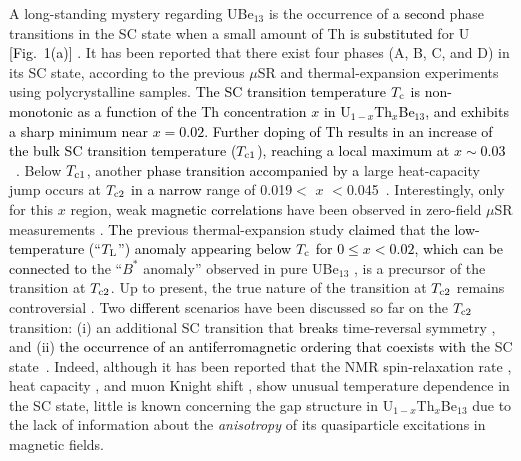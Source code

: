 \documentclass[twocolumn, prl]{revtex4}%
\newcommand{\correct}[1]{\textcolor{black}{#1}}
\begin{document}
A long-standing mystery regarding  UBe$_{13}$   is  the occurrence of  \correct{a second} phase transitions in the SC state when a small amount of Th  is \correct{substituted}  for U \correct{ [Fig.~1(a)]}
 \cite{Smith_Physica_1985, Ott_PRBR_1985}. 
 It has been reported that there exist four phases (A, B, C, and D) in its SC state, according to the previous $\mu$SR 
\cite{Heffner_PRL_1990} and thermal-expansion 
  \cite{Kromer_PRL_1998} experiments using polycrystalline samples.
\correct{The  SC transition temperature $T_{\rm c}$ is non-monotonic as a function of the Th concentration $x$ in U$_{1-x}$Th$_{x}$Be$_{13}$, and exhibits a sharp minimum near $x=0.02$. Further doping of Th results in an increase of the bulk SC transition temperature ($T_{\rm c1}$), reaching a local maximum at $x\sim 0.03$}~\cite{Smith_Physica_1985}.
Below $T_{\rm c1}$,  another \correct{phase transition accompanied by a} large heat-capacity jump occurs  at $T_{ \rm c2}$ \correct{in a narrow} range of 0.019$<$ $x$ $<$0.045~\cite{Ott_PRBR_1985, Heffner_PRL_1990}.
Interestingly,  only for this $x$ region, 
weak \correct{magnetic correlations} have been observed in zero-field $\mu$SR measurements
 \cite{Heffner_PRL_1990}.
\correct{The} previous  thermal-expansion study 
 \cite{Kromer_PRL_1998}
\correct{claimed} that 
\correct{the low-temperature (``$T_{\rm L}$'') anomaly appearing below $T_{\rm c}$ for $0\leq x<0.02$, which can be connected to} the ``$B^*$ anomaly'' observed  in pure UBe$_{13}$ \cite{Kromer_PRL_1998, Ellman_PRBR_1991, YShimizu_PRL_2012},
 is a  precursor of the transition at $T_{\rm c2}$.
Up to present, the true nature of the transition at $T_{\rm c2}$ remains controversial
 \cite{Steglich_RPP_2016, Kenzelmann_RPP_2017}.
Two \correct{different} scenarios  have been discussed so far on the $T_{\rm c2}$ transition: 
  (i)  an additional  SC transition  that \correct{breaks} time-reversal symmetry
  \cite{Sigrist_RevModPhys_1991},
 and  
 (ii) \correct{the occurrence of an antiferromagnetic ordering that coexists with the} SC state~\cite{Batlogg_PRL_1985, Machida_PRL_1987}.
 Indeed,   although 
 it has been reported that  the NMR spin-relaxation rate 
 \cite{MacLaughlin_PRL_1984},  heat capacity 
 \cite{Jin_PRBR_1994},
 and muon Knight shift 
  \cite{Sonier_muSR}, 
 show unusual  temperature dependence in the SC state,  
  little is known concerning  the gap structure in U$_{1-x}$Th$_{x}$Be$_{13}$ due to the lack of information about the \textit{ anisotropy }   of  its quasiparticle excitations in magnetic fields. 
\color{black}
\end{document}
